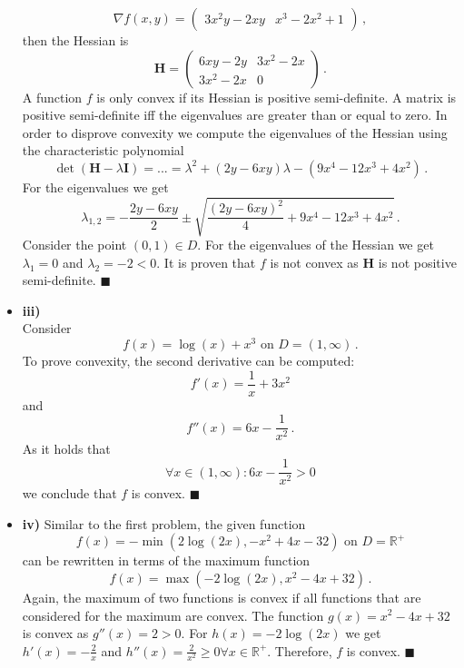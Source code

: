 \documentclass{scrartcl}
\newcommand{\qed}{\hfill $\blacksquare$}
\begin{document}
\begin{itemize}
	\begin{equation}
		\nabla f(x,y) = \begin{pmatrix}
			3x^2y - 2xy&x^3-2x^2+1
		\end{pmatrix}\, ,
	\end{equation}
	then the Hessian is
	\begin{equation}
		\mathbf{H} = \begin{pmatrix}
			6xy-2y&3x^2-2x\\3x^2-2x&0
		\end{pmatrix} \, .
	\end{equation}
	A function $f$ is only convex if its Hessian is positive semi-definite. A matrix is positive semi-definite iff the eigenvalues are greater than or equal to zero. In order to disprove convexity we compute the eigenvalues of the Hessian using the characteristic polynomial
	\begin{equation}
		\det (\mathbf{H} - \lambda \mathbf{I}) = ... = \lambda^2 + (2y - 6xy)\lambda - (9x^4 - 12x^3 + 4x^2) \, .
	\end{equation}
	For the eigenvalues we get
	\begin{equation}
		\lambda_{1,2} = -\frac{2y-6xy}{2} \pm \sqrt{\frac{(2y-6xy)^2}{4} + 9x^4 - 12x^3 + 4x^2} \, .
	\end{equation}
	Consider the point $(0,1)\in D$. For the eigenvalues of the Hessian we get $\lambda_1 = 0$ and $\lambda_2 = -2 < 0$. It is proven that $f$ is not convex as $\mathbf{H}$ is not positive semi-definite. \qed
	\item \textbf{iii)}\\
	Consider
	\begin{equation}
		f(x) = \log(x) + x^3 \text{ on } D=(1, \infty) \, .
	\end{equation}
	To prove convexity, the second derivative can be computed:
	\begin{equation}
		f'(x) = \frac{1}{x} + 3x^2
	\end{equation}
	and
	\begin{equation}
		f''(x) = 6x - \frac{1}{x^2} \, .
	\end{equation}
	As it holds that
	\begin{equation}
		\forall x \in (1, \infty): 6x - \frac{1}{x^2} > 0
	\end{equation}
	we conclude that $f$ is convex. \qed
	\item \textbf{iv)}
	Similar to the first problem, the given function
	\begin{equation}
		f(x) = -\min(2\log(2x), -x^2+4x-32) \text{ on } D = \mathbb{R}^+
	\end{equation}
	can be rewritten in terms of the maximum function
	\begin{equation}
		f(x) = \max(-2\log(2x), x^2-4x+32) \, .
	\end{equation}
	Again, the maximum of two functions is convex if all functions that are considered for the maximum are convex.
	The function $g(x) = x^2 -4x+32$ is convex as $g''(x) = 2 > 0$. For $h(x) = -2\log(2x)$ we get $h'(x) = -\frac{2}{x}$ and $h''(x) = \frac{2}{x^2} \ge 0 \forall x \in \mathbb{R}^+$. Therefore, $f$ is convex. \qed
\end{itemize}
\end{document}
